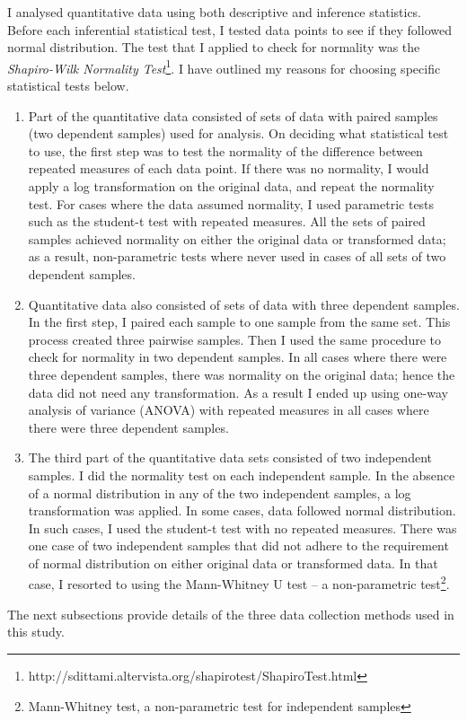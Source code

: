 I analysed quantitative data using both descriptive and inference statistics. Before each inferential statistical test, I tested data points to see if they followed normal distribution. The test that I applied to check for normality was the \emph{Shapiro-Wilk Normality Test}\footnote{http://sdittami.altervista.org/shapirotest/ShapiroTest.html}. I have outlined my reasons for choosing specific statistical tests below.
\begin{enumerate}[label=(\alph*)]
\item  Part of the quantitative data consisted of sets of data with paired samples (two dependent samples) used for analysis. On deciding what statistical test to use, the first step was to test the normality of the difference between repeated measures of each data point. If there was no normality, I would apply a log transformation on the original data, and repeat the normality test. For cases where the data assumed normality, I used parametric tests such as the student-t test with repeated measures. All the sets of paired samples achieved normality on either the original data or transformed data; as a result, non-parametric tests where never used in cases of all sets of two dependent samples.
\item Quantitative data also consisted of sets of data with three dependent samples. In the first step, I paired each sample to one sample from the same set. This process created three pairwise samples. Then  I used the same procedure to check for normality in two dependent samples. In all cases where there were three dependent samples, there was normality on the original data; hence the data did not need any transformation. As a result I ended up using one-way analysis of variance (ANOVA) with repeated measures in all cases where there were three dependent samples.  
\item The third part of the quantitative data sets consisted of two independent samples. I did the normality test on each independent sample. In the absence of a normal distribution in any of the two independent samples, a log transformation was applied. In some cases, data followed normal distribution. In such cases, I used the student-t test with no repeated measures. There was one case of two independent samples that did not adhere to the requirement of normal distribution on either original data or transformed data. In that case, I resorted to using the Mann-Whitney U test -- a non-parametric test\footnote{Mann-Whitney test, a non-parametric test for independent samples}. 
\end{enumerate}
The next subsections provide details of the three data collection methods used in this study.
